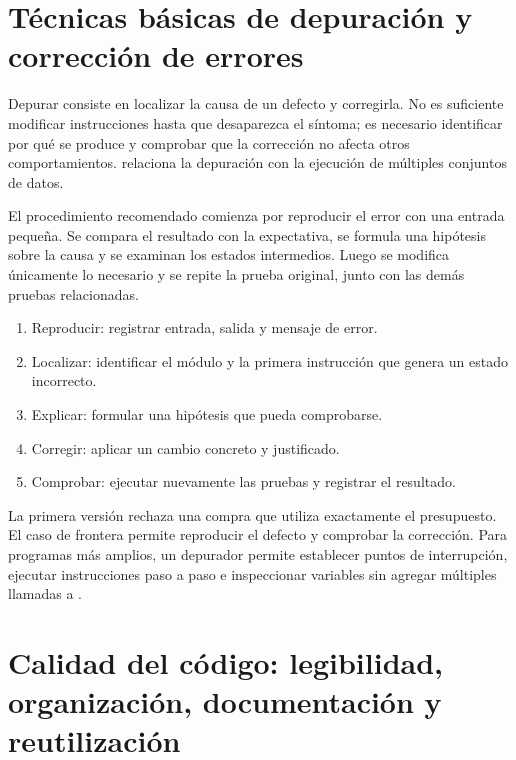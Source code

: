 

\section{Técnicas básicas de depuración y corrección de errores}

Depurar consiste en localizar la causa de un defecto y corregirla. No es suficiente modificar instrucciones hasta que desaparezca el síntoma; es necesario identificar por qué se produce y comprobar que la corrección no afecta otros comportamientos. \textcite[p.~13]{farrell2013} relaciona la depuración con la ejecución de múltiples conjuntos de datos.

El procedimiento recomendado comienza por reproducir el error con una entrada pequeña. Se compara el resultado con la expectativa, se formula una hipótesis sobre la causa y se examinan los estados intermedios. Luego se modifica únicamente lo necesario y se repite la prueba original, junto con las demás pruebas relacionadas.

\begin{enumerate}
\item Reproducir: registrar entrada, salida y mensaje de error.
\item Localizar: identificar el módulo y la primera instrucción que genera un estado incorrecto.
\item Explicar: formular una hipótesis que pueda comprobarse.
\item Corregir: aplicar un cambio concreto y justificado.
\item Comprobar: ejecutar nuevamente las pruebas y registrar el resultado.
\end{enumerate}



La primera versión rechaza una compra que utiliza exactamente el presupuesto. El caso de frontera permite reproducir el defecto y comprobar la corrección. Para programas más amplios, un depurador permite establecer puntos de interrupción, ejecutar instrucciones paso a paso e inspeccionar variables sin agregar múltiples llamadas a .

\section{Calidad del código: legibilidad, organización, documentación y reutilización}


